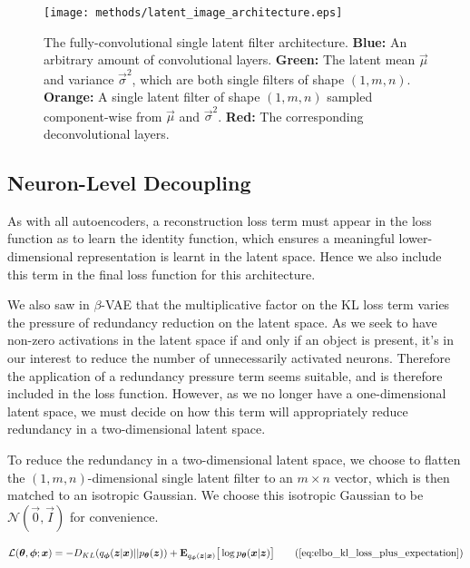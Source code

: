 \begin{figure}[H]
\centering
\captionsetup{justification=centering}
\texttt{[image: methods/latent\_image\_architecture.eps]}
\caption{The fully-convolutional single latent filter architecture. \textbf{Blue:} An arbitrary amount of convolutional layers. \textbf{Green:} The latent mean $\vec{\mu}$ and variance $\vec{\sigma}^2$, which are both single filters of shape $(1, m, n)$. \textbf{Orange:} A single latent filter of shape $(1, m, n)$ sampled component-wise from $\vec{\mu}$ and $\vec{\sigma}^2$. \textbf{Red:} The corresponding deconvolutional layers.}
\label{fig:latent_image_architecture}
\end{figure}

%
%
\subsection{Neuron-Level Decoupling}
As with all autoencoders, a reconstruction loss term must appear in the loss function as to learn the identity function, which ensures a meaningful lower-dimensional representation is learnt in the latent space. Hence we also include this term in the final loss function for this architecture.

We also saw in $\beta$-VAE that the multiplicative factor on the KL loss term varies the pressure of redundancy reduction on the latent space. As we seek to have non-zero activations in the latent space if and only if an object is present, it's in our interest to reduce the number of unnecessarily activated neurons. Therefore the application of a redundancy pressure term seems suitable, and is therefore included in the loss function. However, as we no longer have a one-dimensional latent space, we must decide on how this term will appropriately reduce redundancy in a two-dimensional latent space.

To reduce the redundancy in a two-dimensional latent space, we choose to flatten the $(1, m, n)$-dimensional single latent filter to an $m \times n$ vector, which is then matched to an isotropic Gaussian. We choose this isotropic Gaussian to be $\mathcal{N}(\vec{0}, \vec{I})$ for convenience.

\begin{align}
\mathcal{L}(\vec{\theta}, \vec{\phi}; \vec{x}) = -D_{KL}(q_{\vec{\phi}}(\vec{z}|\vec{x}) || p_{\vec{\theta}}(\vec{z})) + \mathbf{E}_{q_{\vec{\phi}}(\vec{z}|\vec{x})}\big[\log p_{\vec{\theta}}(\vec{x} | \vec{z}) \big]
\tag{\ref{eq:elbo_kl_loss_plus_expectation}}
\end{align}


